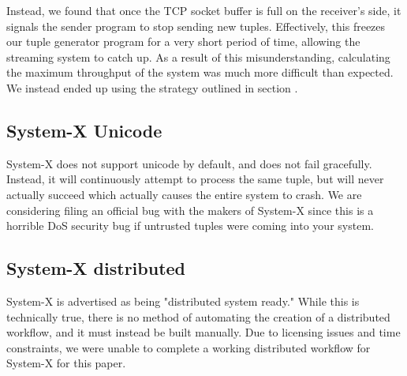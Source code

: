 Instead, we found that once the TCP socket buffer is full on the receiver's side, it signals the sender program to stop sending new tuples.  Effectively, this freezes our tuple generator program for a very short period of time, allowing the streaming system to catch up.  As a result of this misunderstanding, calculating the maximum throughput of the system was much more difficult than expected.  We instead ended up using the strategy outlined in section .

\subsection{System-X Unicode}
System-X does not support unicode by default, and does not fail gracefully.  Instead, it will continuously attempt to process the same tuple, but will never actually succeed which actually causes the entire system to crash. We are considering filing an official bug with the makers of System-X since this is a horrible DoS security bug if untrusted tuples were coming into your system.

\subsection{System-X distributed}
\label{ssec:sysx-dist}
System-X is advertised as being "distributed system ready."  While this is technically true, there is no method of automating the creation of a distributed workflow, and it must instead be built manually.  Due to licensing issues and time constraints, we were unable to complete a working distributed workflow for System-X for this paper.
